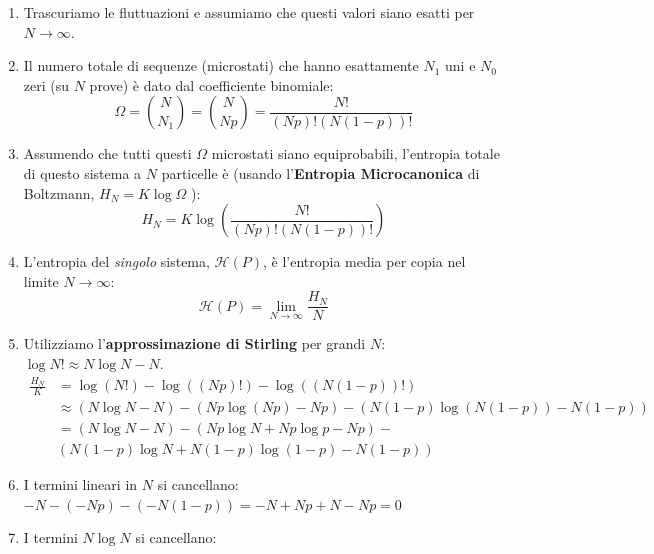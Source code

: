 \begin{enumerate}
\begin{enumerate}
    Possiamo vedere come "successo" lo stato con $Pr = p$ o lo stato con $Pr = q = (1-p)$ e abbiamo questi due valori medi per le due Distribuzioni Binomiali.
    \item Trascuriamo le fluttuazioni e assumiamo che questi valori siano esatti per $N \to \infty$.
    \item Il numero totale di sequenze (microstati) che hanno esattamente $N_1$ uni e $N_0$ zeri (su $N$ prove) è dato dal coefficiente binomiale:
    \begin{equation}
        \Omega = \binom{N}{N_1} = \binom{N}{Np} = \frac{N!}{(Np)! (N(1-p))!}
        \label{eq:omega_binomial}
    \end{equation}
    \item Assumendo che tutti questi $\Omega$ microstati siano equiprobabili, l'entropia totale di questo sistema a $N$ particelle è (usando l'\textbf{Entropia Microcanonica} di Boltzmann, $H_N = K \log \Omega$ ):
    $$ H_N = K \log \left( \frac{N!}{(Np)! (N(1-p))!} \right) $$
    \item L'entropia del \textit{singolo} sistema, $\mathcal{H}(P)$, è l'entropia media per copia nel limite $N \to \infty$:
    $$ \mathcal{H}(P) = \lim_{N \to \infty} \frac{H_N}{N} $$
    \item Utilizziamo l'\textbf{approssimazione di Stirling} per grandi $N$: $\log N! \approx N \log N - N$.
    \begin{align*}
        \frac{H_N}{K} &= \log(N!) - \log((Np)!) - \log((N(1-p))!) \\
        &\approx (N \log N - N) - (Np \log(Np) - Np) - (N(1-p) \log(N(1-p)) - N(1-p)) \\
        &= (N \log N - N) - (Np \log N + Np \log p - Np) - \\& (N(1-p) \log N + N(1-p) \log(1-p) - N(1-p))
    \end{align*}
    \item I termini lineari in $N$ si cancellano: 
    $-N - (-Np) - (-N(1-p)) = -N + Np + N - Np = 0$
    \item I termini $N \log N$ si cancellano:
    

\end{enumerate}
\end{enumerate}
